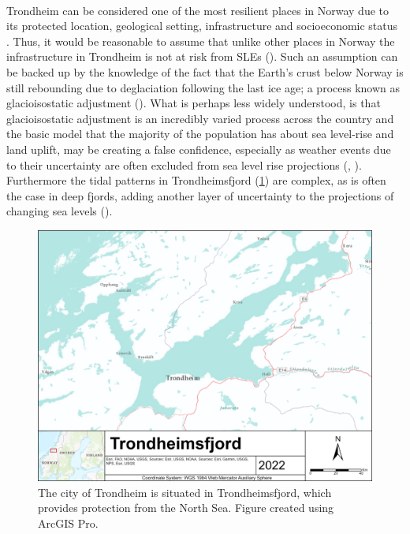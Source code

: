 \paragraph{}
Trondheim can be considered one of the most resilient places in Norway due to its protected location, geological setting, infrastructure and socioeconomic status \cite{opach_seeking_2020}. Thus, it would be reasonable to assume that unlike other places in Norway the infrastructure in Trondheim is not at risk from SLEs (\cite{baisotti_farevarsel_2020}). Such an assumption can be backed up by the knowledge of the fact that the Earth's crust below Norway is still rebounding due to deglaciation following the last ice age; a process known as glacioisostatic adjustment (\cite{breili_high-accuracy_2020}). What is perhaps less widely understood, is that glacioisostatic adjustment is an incredibly varied process across the country and the basic model that the majority of the population has about sea level-rise and land uplift, may be creating a false confidence, especially as weather events due to their uncertainty are often excluded from sea level rise projections  (\cite{breili_high-accuracy_2020}, \cite{hanssen-bauer_climate_2017}).  Furthermore the tidal patterns in Trondheimsfjord (\ref{fig:research_area}) are complex, as is often the case in deep fjords, adding another layer of uncertainty to the projections of changing sea levels (\cite{hanssen-bauer_climate_2017}).

\begin{figure}[H]
    \centering
    \includegraphics[width=1.0\textwidth]{fig/Trondheimsfjord.png}
    \caption[Research area - Trondheimsfjord]
    {The city of Trondheim is situated in Trondheimsfjord, which provides protection from the North Sea. Figure created using ArcGIS Pro. }
    \label{fig:research_area}
    
\end{figure}




